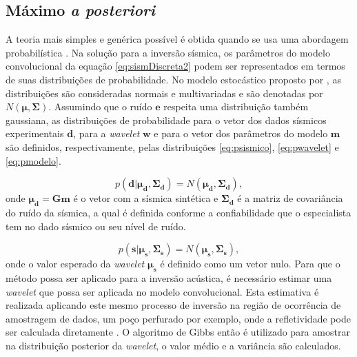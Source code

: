 \subsection{Máximo \textit{a posteriori}}
\label{sec:map}

A teoria mais simples e genérica possível é obtida quando se usa uma
abordagem probabilística \citep{tarantola}. Na solução para a inversão
sísmica, os parâmetros do modelo convolucional da equação \ref{eq:sismDiscreta2}
podem ser representados em termos de suas distribuições de probabilidade.
No modelo estocástico proposto por \cite{leandroGRSL}, as distribuições
são consideradas normais e multivariadas e são denotadas por $N(\boldsymbol{\mu},\boldsymbol{\Sigma})$.
Assumindo que o ruído $\boldsymbol{e}$ respeita uma distribuição também gaussiana,
as distribuições de probabilidade para o vetor dos dados sísmicos experimentais
$\boldsymbol{d}$, para a \textit{wavelet} $\boldsymbol{w}$ e para
o vetor dos parâmetros do modelo $\boldsymbol{m}$ são
definidos, respectivamente, pelas distribuições \ref{eq:psismico}, \ref{eq:pwavelet} e \ref{eq:pmodelo}.

\begin{equation}
\label{eq:psismico}
p(\boldsymbol{d}|\boldsymbol{\mu_{d}},\boldsymbol{\Sigma_{d}}) =
N(\boldsymbol{\mu_{d}},\boldsymbol{\Sigma_{d}}),
\end{equation}
onde $\boldsymbol{\mu_{d}} = \boldsymbol{Gm}$ é o vetor com a sísmica
sintética e $\boldsymbol{\Sigma_{d}}$ é a matriz de covariância do ruído da
sísmica, a qual é definida conforme a confiabilidade que o especialista tem no
dado sísmico ou seu nível de ruído.

\begin{equation}
\label{eq:pwavelet}
p(\boldsymbol{s}|\boldsymbol{\mu_{s}},\boldsymbol{\Sigma_{s}}) =
N(\boldsymbol{\mu_{s}},\boldsymbol{\Sigma_{s}}),
\end{equation} 
onde o valor esperado da \textit{wavelet} $\boldsymbol{\mu_{s}}$ é definido
como um vetor nulo. Para que o método possa ser aplicado para a inversão
acústica, é necessário estimar uma \textit{wavelet} que possa ser aplicada
no modelo convolucional. Esta estimativa é realizada aplicando este mesmo processo
de inversão na região de ocorrência de amostragem de dados, um poço perfurado por exemplo, onde a refletividade pode
ser calculada diretamente \citep{leandroGRSL}. O algoritmo de
Gibbs então é utilizado para amostrar na distribuição posterior da \textit{wavelet}, 
o valor médio e a variância são calculados.

